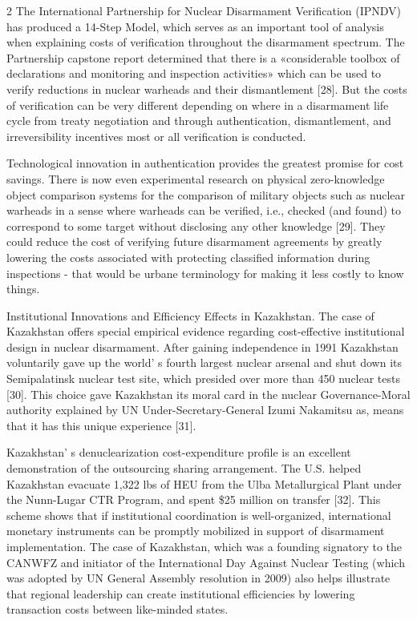 \begin{multicols}{2}
The International Partnership for Nuclear Disarmament Verification
(IPNDV) has produced a 14-Step Model, which serves as an important tool
of analysis when explaining costs of verification throughout the
disarmament spectrum. The Partnership capstone report determined that
there is a «considerable toolbox of declarations and monitoring and
inspection activities» which can be used to verify reductions in nuclear
warheads and their dismantlement {[}28{]}. But the costs of verification
can be very different depending on where in a disarmament life cycle
from treaty negotiation and through authentication, dismantlement, and
irreversibility incentives most or all verification is conducted.

Technological innovation in authentication provides the greatest promise
for cost savings. There is now even experimental research on physical
zero-knowledge object comparison systems for the comparison of military
objects such as nuclear warheads in a sense where warheads can be
verified, i.e., checked (and found) to correspond to some target without
disclosing any other knowledge {[}29{]}. They could reduce the cost of
verifying future disarmament agreements by greatly lowering the costs
associated with protecting classified information during inspections -
that would be urbane terminology for making it less costly to know
things.

Institutional Innovations and Efficiency Effects in Kazakhstan. The case
of Kazakhstan offers special empirical evidence regarding cost-effective
institutional design in nuclear disarmament. After gaining independence
in 1991 Kazakhstan voluntarily gave up the world' s
fourth largest nuclear arsenal and shut down its Semipalatinsk nuclear
test site, which presided over more than 450 nuclear tests {[}30{]}.
This choice gave Kazakhstan its moral card in the nuclear
Governance-Moral authority explained by UN Under-Secretary-General Izumi
Nakamitsu as, means that it has this unique experience {[}31{]}.

Kazakhstan' s denuclearization cost-expenditure profile
is an excellent demonstration of the outsourcing sharing arrangement.
The U.S. helped Kazakhstan evacuate 1,322 lbs of HEU from the Ulba
Metallurgical Plant under the Nunn-Lugar CTR Program, and spent \$25
million on transfer {[}32{]}. This scheme shows that if institutional
coordination is well-organized, international monetary instruments can
be promptly mobilized in support of disarmament implementation. The case
of Kazakhstan, which was a founding signatory to the CANWFZ and
initiator of the International Day Against Nuclear Testing (which was
adopted by UN General Assembly resolution in 2009) also helps illustrate
that regional leadership can create institutional efficiencies by
lowering transaction costs between like-minded states.


\end{multicols}
